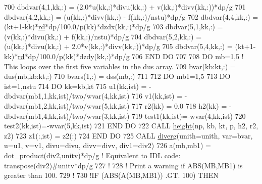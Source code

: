 \begin{DoxyCode}
700     dbdvar(4,1,kk,:)    = (2.0*u(kk,:)*divu(kk,:) + v(kk,:)*divv(kk,:))*dp/\hyperlink{namespaceconstants_a046aef138fbc8d05251d4fdc6eb3ee89}{g}
701     dbdvar(4,2,kk,:)    = (u(kk,:)*divv(kk,:) - f(kk,:)/nstu)*dp/\hyperlink{namespaceconstants_a046aef138fbc8d05251d4fdc6eb3ee89}{g}
702     dbdvar(4,4,kk,:)    = (kt+1-kk)*\hyperlink{namespaceconstants_ad91564da82b97ea0d29ce0565565db85}{rd}*dp/100.0/p(kk)*dzdx(kk,:)*dp/\hyperlink{namespaceconstants_a046aef138fbc8d05251d4fdc6eb3ee89}{g}
703     dbdvar(5,1,kk,:)    = (v(kk,:)*divu(kk,:) + f(kk,:)/nstu)*dp/\hyperlink{namespaceconstants_a046aef138fbc8d05251d4fdc6eb3ee89}{g}
704     dbdvar(5,2,kk,:)    = (u(kk,:)*divu(kk,:) + 2.0*v(kk,:)*divv(kk,:))*dp/\hyperlink{namespaceconstants_a046aef138fbc8d05251d4fdc6eb3ee89}{g}
705     dbdvar(5,4,kk,:)    = (kt+1-kk)*\hyperlink{namespaceconstants_ad91564da82b97ea0d29ce0565565db85}{rd}*dp/100.0/p(kk)*dzdy(kk,:)*dp/\hyperlink{namespaceconstants_a046aef138fbc8d05251d4fdc6eb3ee89}{g}
706 \textcolor{keywordflow}{END DO}
707 
708 \textcolor{keywordflow}{DO} mb=1,5                   \textcolor{comment}{! This loops over the first five variables in the dus array.}
709     bvar(kb:kt,:)       = dus(mb,kb:kt,:)
710     bvars(1,:)          = dss(mb,:)
711 
712     \textcolor{keywordflow}{DO} mb1=1,5
713         \textcolor{keywordflow}{DO} ist=1,nstu
714             \textcolor{keywordflow}{DO} kk=kb,kt
715                 u1(kk,ist)  = -dbdvar(mb1,1,kk,ist)/two/wvar(4,kk,ist)
716                 v1(kk,ist)  = -dbdvar(mb1,2,kk,ist)/two/wvar(5,kk,ist)
717                 r2(kk)      = 0.0
718                 h2(kk)      = -dbdvar(mb1,4,kk,ist)/two/wvar(3,kk,ist)
719                 test1(kk,ist)=-wvar(4,kk,ist)
720                 test2(kk,ist)=-wvar(5,kk,ist)
721 \textcolor{keywordflow}{            END DO}
722             \textcolor{keyword}{CALL }\hyperlink{namespacephysics_a0ca41ce81224f2d7b292dc474c080c60}{height}(np, kb, kt, p, h2, r2, z2)
723             z1(:,ist)       = z2(:)
724 \textcolor{keywordflow}{        END DO}
725         \textcolor{keyword}{CALL }\hyperlink{namespacephysics_adc35216d512f6586071a79fba286a39c}{diverg}(unith=unith, var=bvar, u=u1, v=v1, divu=divu, divv=divv, div1=div2)
726         a(mb,mb1)           = dot\_product(div2,unitv)*dp/\hyperlink{namespaceconstants_a046aef138fbc8d05251d4fdc6eb3ee89}{g}          \textcolor{comment}{! Equivalent to IDL code:
       transpose(div2)#unitv*dp/g}
727         \textcolor{comment}{!}
728         \textcolor{comment}{! Print a warning if ABS(MB,MB1) is greater than 100.}
729         \textcolor{comment}{!}
730         \textcolor{comment}{!IF (ABS(A(MB,MB1)) .GT. 100) THEN}

\end{DoxyCode}

